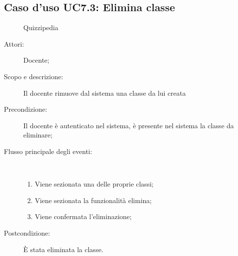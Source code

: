 \subsection{Caso d'uso UC7.3: Elimina classe}
	\begin{figure}[H]
		\centering
		\begin{resizedtikzpicture}{\textwidth}
		\begin{umlsystem}[x=0, fill=lightgray!20]{Quizzipedia}
		\end{umlsystem}
		\end{resizedtikzpicture}
		\caption{}
	\end{figure}
\begin{description}
\item[Attori:] Docente;
\item[Scopo e descrizione:] Il docente rimuove dal sistema una classe da lui creata 
      \item[Precondizione:] Il docente è autenticato nel sistema, è presente nel sistema la classe da eliminare;

        \item[Flusso principale degli eventi:] \ 
 \begin{enumerate}
          \item Viene sezionata una delle proprie classi;
          \item Viene sezionata la funzionalità elimina;
          \item Viene confermata l'eliminazione;

      \end{enumerate}
    \item[Postcondizione:] È stata eliminata la classe.
  \end{description}
\hypertarget{UC7.4}{}
